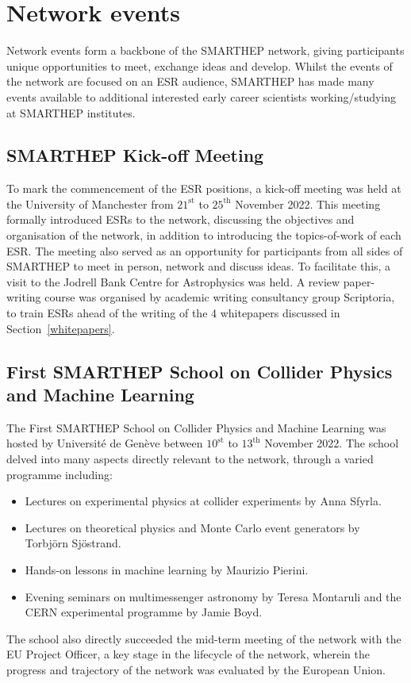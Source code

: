 \section{Network events}
\label{events}
Network events form a backbone of the SMARTHEP network, giving participants unique opportunities to meet, exchange ideas and develop. Whilst the events of the network are focused on an ESR audience, SMARTHEP has made many events available to additional interested early career scientists working/studying at SMARTHEP institutes.

\subsection{SMARTHEP Kick-off Meeting}
\label{kick-off}
To mark the commencement of the ESR positions, a kick-off meeting was held at the University of Manchester from ${21}^\text{st}$ to ${25}^\text{th}$ November 2022. This meeting formally introduced ESRs to the network, discussing the objectives and organisation of the network, in addition to introducing the topics-of-work of each ESR. The meeting also served as an opportunity for participants from all sides of SMARTHEP to meet in person, network and discuss ideas. To facilitate this, a visit to the Jodrell Bank Centre for Astrophysics was held. A review paper-writing course was organised by academic writing consultancy group Scriptoria, to train ESRs ahead of the writing of the 4 whitepapers discussed in Section~\ref{whitepapers}.


\subsection{First SMARTHEP School on Collider Physics and Machine Learning}
\label{unige-school}
The First SMARTHEP School on Collider Physics and Machine Learning was hosted by Universit\'e de Gen\`eve between ${10}^\text{st}$ to ${13}^\text{th}$ November 2022. The school delved into many aspects directly relevant to the network, through a varied programme including:
\begin{itemize}
    \item Lectures on experimental physics at collider experiments by Anna Sfyrla.  
    \item Lectures on theoretical physics and Monte Carlo event generators by Torbj\"orn Sj\"ostrand.
    \item Hands-on lessons in machine learning by Maurizio Pierini.
    \item Evening seminars on multimessenger astronomy by Teresa Montaruli and the CERN experimental programme by Jamie Boyd.
\end{itemize}
The school also directly succeeded the mid-term meeting of the network with the EU Project Officer, a key stage in the lifecycle of the network, wherein the progress and trajectory of the network was evaluated by the European Union.


